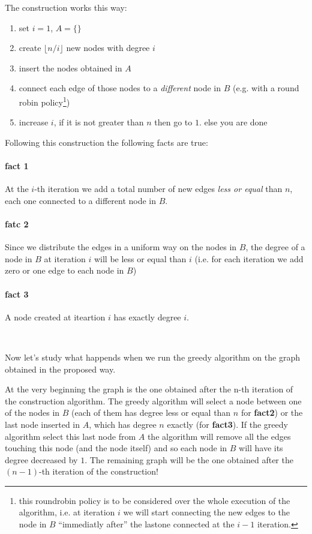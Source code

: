 \documentclass[a4paper]{article}
\begin{document}
The construction works this way:
\begin{enumerate}
\item set $i = 1$, $A = \{\}$
\item create $\lfloor n/i \rfloor$ new nodes with degree $i$ 
\item insert the nodes obtained in $A$
\item connect each edge of those nodes to a \emph{different} node in $B$ (e.g. with a round robin policy\footnote{this roundrobin policy is to be considered over the whole execution of the algorithm, i.e. at iteration $i$ we will start connecting the new edges to the node in $B$ ``immediatly after'' the lastone connected at the $i-1$ iteration.})
\item increase $i$, if it is not greater than $n$ then go to $1.$ else you are done
\end{enumerate}

Following this construction the following facts are true:

\paragraph{fact 1}At the $i$-th iteration we add a total number of new edges \emph{less or equal} than $n$, each one connected to a different node in $B$.

\paragraph{fatc 2}Since we distribute the edges in a uniform way on the nodes in $B$, the degree of a node in $B$ at iteration $i$ will be less or equal than $i$ (i.e. for each iteration we add zero or one edge to each node in $B$)
\paragraph{fact 3}A node created at iteartion $i$ has exactly degree $i$.

\

\noindent Now let's study what happends when we run the greedy algorithm on the graph obtained in the proposed way.

At the very beginning the graph is the one obtained after the n-th iteration of the construction algorithm. 
The greedy algorithm will select a node between one of the nodes in $B$ (each of them has degree less or equal than $n$ for \textbf{fact2}) or the last node inserted in $A$, which has degree $n$ exactly (for \textbf{fact3}).
If the greedy algorithm select this last node from $A$ the algorithm will remove all the edges touching this node (and the node itself) and so each node in $B$ will have its degree decreased by $1$.
The remaining graph will be the one obtained after the $(n-1)$-th iteration of the construction!
\end{document}
